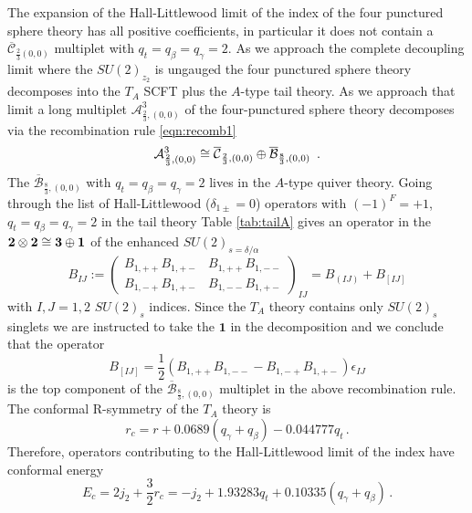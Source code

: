 \documentclass[main.tex]{subfiles}
\begin{document}
The expansion of the Hall-Littlewood limit of the index of the four punctured sphere theory has all positive coefficients, in particular it does not contain a $\overline{\mathcal{C}}_{\frac{2}{3}(0,0)}$ multiplet with $q_t=q_{\beta}=q_{\gamma}=2$. 
As we approach the complete decoupling limit where the $SU(2)_{z_2}$ is ungauged the four punctured sphere theory decomposes into the $T_A$ SCFT plus the $A$-type tail theory. As we approach that limit a long multiplet $\mathcal{A}^{3}_{\frac{2}{3},(0,0)}$ of the four-punctured sphere theory decomposes via the recombination rule \eqref{eqn:recomb1}
\begin{equation}
\mathcal{A}^{3}_{\frac{2}{3},(0,0)}\cong\overline{\mathcal{C}}_{\frac{2}{3},(0,0)}\oplus\overline{\mathcal{B}}_{\frac{8}{3},(0,0)} \, \ .
\end{equation}
The $\overline{\mathcal{B}}_{\frac{8}{3},(0,0)}$  with $q_t=q_{\beta}=q_{\gamma}=2$ lives in the $A$-type quiver theory. Going through the list of Hall-Littlewood ($\delta_{1\pm}=0$) operators with $(-1)^F=+1$, $q_t=q_{\beta}=q_{\gamma}=2$ in the tail theory Table \ref{tab:tailA} gives an operator in the $\mathbf{2}\otimes\mathbf{2}\cong\mathbf{3}\oplus\mathbf{1}$ of the enhanced $SU(2)_{s=\delta/\alpha}$ 
\begin{equation}
B_{IJ}:=\begin{pmatrix}
B_{1,++}B_{1,+-}&B_{1,++}B_{1,--}\\
B_{1,-+}B_{1,+-}&B_{1,--}B_{1,+-}
\end{pmatrix}_{IJ}=B_{(IJ)}+B_{[IJ]}
\end{equation}
with $I,J=1,2$ $SU(2)_{s}$ indices. Since the $T_A$ theory contains only $SU(2)_s$ singlets we are instructed to take the $\mathbf{1}$ in the decomposition and we conclude that the operator 
\begin{equation}
B_{[IJ]}=\frac{1}{2}(B_{1,++}B_{1,--}- B_{1,-+}B_{1,+-})\epsilon_{IJ}
\end{equation}
is the top component of the $\overline{\mathcal{B}}_{\frac{8}{3},(0,0)}$ multiplet in the above recombination rule.
The conformal R-symmetry of the $T_A$ theory is \cite{Razamat:2016dpl}
\begin{equation}
r_c=r+0.0689(q_{\gamma}+q_{\beta})-0.044777q_t\,.
\end{equation}
Therefore, operators contributing to the Hall-Littlewood limit of the index have conformal energy
\begin{equation}
E_c=2j_2+\frac{3}{2}r_c=-j_2 + 1.93283 q_t+ 0.10335 (q_{\gamma}+q_{\beta})\,.
\end{equation}
\end{document}

